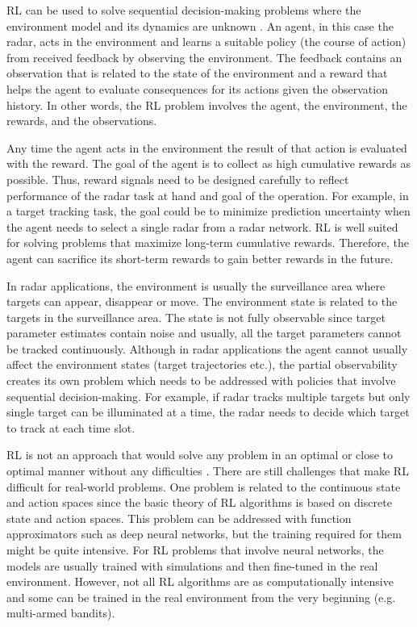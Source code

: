\documentclass[11pt,a4paper]{article}
\begin{document}
RL can be used to solve sequential decision-making problems where the environment model and its dynamics are unknown \cite{Sutton2018}.
An agent, in this case the radar, acts in the environment and learns a suitable policy (the course of action) from received feedback by observing the environment.
The feedback contains an observation that is related to the state of the environment and a reward that helps the agent to evaluate consequences for its actions given the observation history.
In other words, the RL problem involves the agent, the environment, the rewards, and the observations.

Any time the agent acts in the environment the result of that action is evaluated with the reward.
The goal of the agent is to collect as high cumulative rewards as possible.
Thus, reward signals need to be designed carefully to reflect performance of the radar task at hand and goal of the operation.
For example, in a target tracking task, the goal could be to minimize prediction uncertainty when the agent needs to select a single radar from a radar network.
RL is well suited for solving problems that maximize long-term cumulative rewards.
Therefore, the agent can sacrifice its short-term rewards to gain better rewards in the future.

In radar applications, the environment is usually the surveillance area where targets can appear, disappear or move.
The environment state is related to the targets in the surveillance area.
The state is not fully observable since target parameter estimates contain noise and usually, all the target parameters cannot be tracked continuously.
Although in radar applications the agent cannot usually affect the environment states (target trajectories etc.), the partial observability creates its own problem which needs to be addressed with policies that involve sequential decision-making.
For example, if radar tracks multiple targets but only single target can be illuminated at a time, the radar needs to decide which target to track at each time slot.

RL is not an approach that would solve any problem in an optimal or close to optimal manner without any difficulties \cite{Irpan2018}.
There are still challenges that make RL difficult for real-world problems.
One problem is related to the continuous state and action spaces since the basic theory of RL algorithms is based on discrete state and action spaces. 
This problem can be addressed with function approximators such as deep neural networks, but the training required for them might be quite intensive.
For RL problems that involve neural networks, the models are usually trained with simulations and then fine-tuned in the real environment.
However, not all RL algorithms are as computationally intensive and some can be trained in the real environment from the very beginning (e.g. multi-armed bandits).
\end{document}
